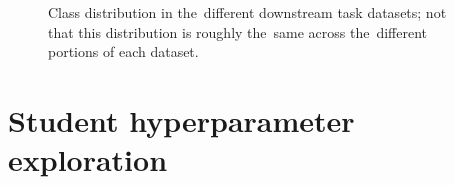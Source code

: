 \documentclass[bsc,frontabs,singlespacing,parskip,deptreport]{infthesis}
\begin{document}
{  \begin{figure}[h!tb]
    \centering
    \caption{Class distribution in the~different downstream task datasets; not that this distribution is roughly the~same across the~different portions of each dataset.}
    \label{fig:class-balance}
  \end{figure}
}

\chapter{Student hyperparameter exploration}{
  \label{chap:A-student-training}
  
}
\end{document}

